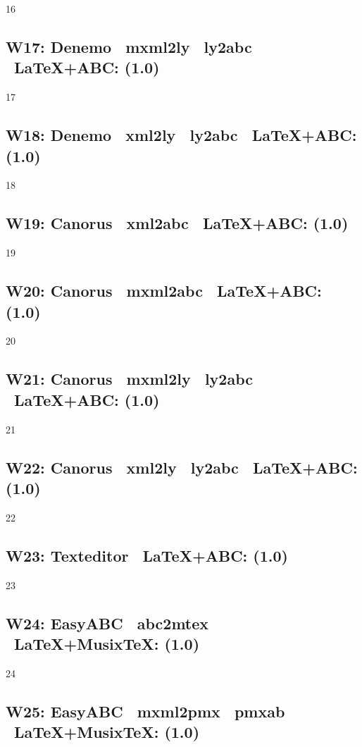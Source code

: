16

\subsection{W17: Denemo \ra\ mxml2ly \ra\ ly2abc \ra\ \LaTeX+ABC: (1.0)} 

17

\subsection{W18: Denemo \ra\ xml2ly \ra\ ly2abc \ra\ \LaTeX+ABC: (1.0)} 

18

\subsection{W19: Canorus \ra\ xml2abc \ra\ \LaTeX+ABC: (1.0)} 

19

\subsection{W20: Canorus \ra\ mxml2abc \ra\ \LaTeX+ABC: (1.0)} 

20

\subsection{W21: Canorus \ra\ mxml2ly \ra\ ly2abc \ra\ \LaTeX+ABC: (1.0)} 

21

\subsection{W22: Canorus \ra\ xml2ly \ra\ ly2abc \ra\ \LaTeX+ABC: (1.0)} 

22

\subsection{W23: Texteditor \ra\ \LaTeX+ABC: (1.0)}

23

\subsection{W24: EasyABC \ra\ abc2mtex \ra\ \LaTeX+Musix\TeX: (1.0)} 

24

\subsection{W25: EasyABC \ra\ mxml2pmx \ra\ pmxab \ra\ \LaTeX+Musix\TeX: (1.0)} 

